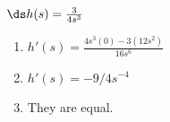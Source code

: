 {$\ds h(s)= \frac{3}{4s^3}$
}
{\begin{enumerate}
\item		$h'(s) = \frac{4s^3(0) - 3(12s^2)}{16s^6}$
\item		$h'(s) = -9/4s^{-4}$
\item		They are equal.
\end{enumerate}
}
